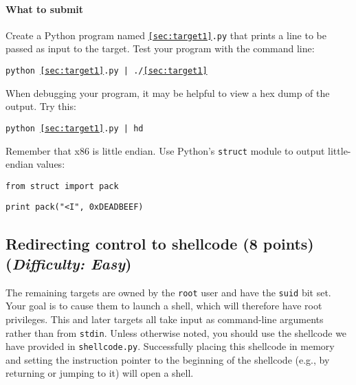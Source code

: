 \documentclass[letterpaper,12pt]{report}
\begin{document}
{\paragraph{What to submit}
Create a Python program named \texttt{\ref{sec:target1}.py} that prints a line to be passed as input to the target.  Test your program with the command line:

\smallskip

\quad\texttt{python \ref{sec:target1}.py | ./\ref{sec:target1}}

\medskip

When debugging your program, it may be helpful to view a hex dump of the output.  Try this:
\smallskip

\quad\texttt{python \ref{sec:target1}.py | hd}
\medskip

Remember that x86 is little endian.  Use Python's \texttt{struct} module to output little-endian values:
\smallskip

\quad\texttt{from struct import pack}

\quad\texttt{print pack("<I", 0xDEADBEEF)}

\subsection{Redirecting control to shellcode (8 points)\hfill\rm\normalsize (\emph{Difficulty: Easy})}
\label{sec:target2}

The remaining targets are owned by the \texttt{root} user and have the \texttt{suid} bit set.  Your goal is to cause them to launch a shell, which will therefore have root privileges.  This and later targets all take input as command-line arguments rather than from \texttt{stdin}.  Unless otherwise noted, you should use the shellcode we have provided in \texttt{shellcode.py}.  Successfully placing this shellcode in memory and setting the instruction pointer to the beginning of the shellcode (e.g., by returning or jumping to it) will open a shell.

}
\end{document}
